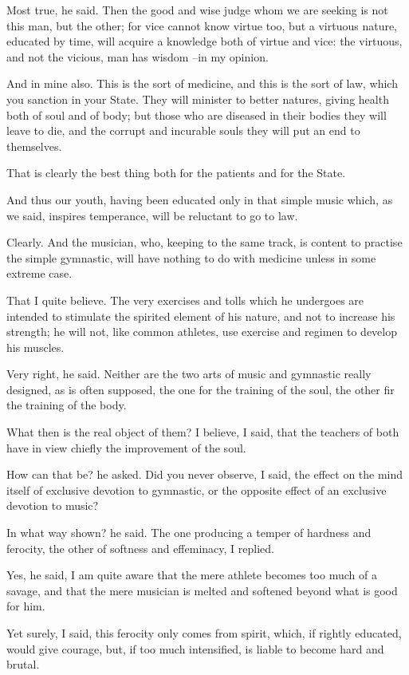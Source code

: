 Most true, he said.
Then the good and wise judge whom we are seeking is not this man, but the other; for vice cannot know virtue too, but a virtuous nature, educated by time, will acquire a knowledge both of virtue and vice: the virtuous, and not the vicious, man has wisdom --in my opinion.

And in mine also.
This is the sort of medicine, and this is the sort of law, which you sanction in your State. They will minister to better natures, giving health both of soul and of body; but those who are diseased in their bodies they will leave to die, and the corrupt and incurable souls they will put an end to themselves.

That is clearly the best thing both for the patients and for the State.

And thus our youth, having been educated only in that simple music which, as we said, inspires temperance, will be reluctant to go to law.

Clearly.
And the musician, who, keeping to the same track, is content to practise the simple gymnastic, will have nothing to do with medicine unless in some extreme case.

That I quite believe.
The very exercises and tolls which he undergoes are intended to stimulate the spirited element of his nature, and not to increase his strength; he will not, like common athletes, use exercise and regimen to develop his muscles.

Very right, he said.
Neither are the two arts of music and gymnastic really designed, as is often supposed, the one for the training of the soul, the other fir the training of the body.

What then is the real object of them?
I believe, I said, that the teachers of both have in view chiefly the improvement of the soul.

How can that be? he asked.
Did you never observe, I said, the effect on the mind itself of exclusive devotion to gymnastic, or the opposite effect of an exclusive devotion to music?

In what way shown? he said.
The one producing a temper of hardness and ferocity, the other of softness and effeminacy, I replied.

Yes, he said, I am quite aware that the mere athlete becomes too much of a savage, and that the mere musician is melted and softened beyond what is good for him.

Yet surely, I said, this ferocity only comes from spirit, which, if rightly educated, would give courage, but, if too much intensified, is liable to become hard and brutal.

